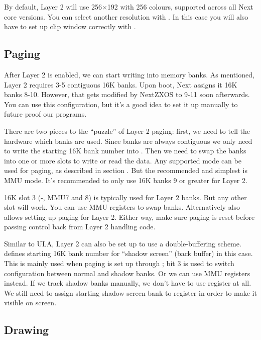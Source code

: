 By default, Layer 2 will use 256$\times$192 with 256 colours, supported across all Next core versions. You can select another resolution with . In this case you will also have to set up clip window correctly with .


\subsection{Paging}

After Layer 2 is enabled, we can start writing into memory banks. As mentioned, Layer 2 requires 3-5 contiguous 16K banks. Upon boot, Next assigns it 16K banks 8-10. However, that gets modified by NextZXOS to 9-11 soon afterwards. You can use this configuration, but it's a good idea to set it up manually to future proof our programs.

There are two pieces to the ``puzzle'' of Layer 2 paging: first, we need to tell the hardware which banks are used. Since banks are always contiguous we only need to write the starting 16K bank number into . Then we need to swap the banks into one or more slots to write or read the data. Any supported mode can be used for paging, as described in section . But the recommended and simplest is MMU mode. It's recommended to only use 16K banks 9 or greater for Layer 2.

16K slot 3 (-, MMU7 and 8) is typically used for Layer 2 banks. But any other slot will work. You can use MMU registers to swap banks. Alternatively  also allows setting up paging for Layer 2. Either way, make sure paging is reset before passing control back from Layer 2 handling code.

Similar to ULA, Layer 2 can also be set up to use a double-buffering scheme.  defines starting 16K bank number for ``shadow screen'' (back buffer) in this case. This is mainly used when paging is set up through ; bit 3 is used to switch configuration between normal and shadow banks. Or we can use MMU registers instead. If we track shadow banks manually, we don't have to use register  at all. We still need to assign starting shadow screen bank to register  in order to make it visible on screen.


\subsection{Drawing}

